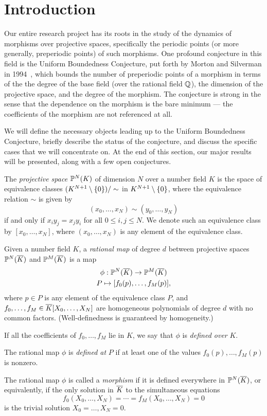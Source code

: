 \section{Introduction}
\label{sec:bg}

Our entire research project has its roots in the study of the dynamics
of morphisms over projective spaces, specifically the periodic points
(or more generally, preperiodic points) of such morphisms. One
profound conjecture in this field is the Uniform Boundedness
Conjecture, put forth by Morton and Silverman in
1994~\cite{MR1264933}, which bounds the number of preperiodic points
of a morphism in terms of the the degree of the base field (over the
rational field $\Q$), the dimension of the projective space, and the
degree of the morphism. The conjecture is strong in the sense that the
dependence on the morphism is the bare minimum --- the coefficients of
the morphism are not referenced at all.

We will define the necessary objects leading up to the Uniform
Boundedness Conjecture, briefly describe the status of the conjecture,
and discuss the specific cases that we will concentrate on. At the end
of this section, our major results will be presented, along with a few
open conjectures.

\begin{definition}
  The \emph{projective space} $\P^N(K)$ of dimension $N$ over a number
  field $K$ is the space of equivalence classes $(K^{N+1} \setminus
  \set{0})/\sim$ in $K^{N+1} \setminus \set{0}$, where the equivalence
  relation $\sim$ is given by
  \[
  (x_0, \dots, x_N) \sim (y_0, \dots, y_N)
  \]
  if and only if $x_i y_j = x_j y_i$ for all $0 \le i, j \le N$. We
  denote such an equivalence class by $[x_0, \dots, x_N]$, where
  $(x_0, \dots, x_N)$ is any element of the equivalence class.
\end{definition}

\begin{definition}
  Given a number field $K$, a \emph{rational map} of degree $d$
  between projective spaces $\P^N(\ol{K})$ and $\P^M(\ol{K})$ is a
  map
  \[
  \begin{gathered}
    \phi: \P^N(\ol{K}) \to \P^M(\ol{K})\\
    P \mapsto [f_0(p), \dots, f_M(p)],
  \end{gathered}
  \]
  where $p \in P$ is any element of the equivalence class $P$, and
  $f_0, \dots, f_M \in \ol{K}[X_0, \dots, X_N]$ are homogeneous
  polynomials of degree $d$ with no common factors. (Well-definedness
  is guaranteed by homogeneity.)

  If all the coefficients of $f_0, \dots, f_M$ lie in $K$, we say that $\phi$ is \emph{defined over} $K$.

  The rational map $\phi$ is \emph{defined at} $P$ if at least one of
  the values $f_0(p), \dots, f_M(p)$ is nonzero.

  The rational map $\phi$ is called a \emph{morphism} if it is defined
  everywhere in $\P^N(\ol{K})$, or equivalently, if the only solution
  in $\ol{K}$ to the simultaneous equations
  \[
  f_0(X_0, \dots, X_N) = \cdots = f_M(X_0, \dots, X_N) = 0
  \]
  is the trivial solution $X_0 = \dots, X_N = 0$.
\end{definition}

